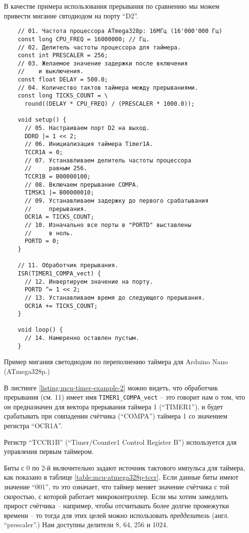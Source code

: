 \documentclass[../sparc.tex]{subfiles}
\begin{document}
В качестве примера использования прерывания по сравнению мы можем привести
мигание свтодиодом на порту ``D2''.

\begin{listing}[H]
  \begin{verbatim}
    // 01. Частота процессора ATmega328p: 16МГц (16'000'000 Гц)
    const long CPU_FREQ = 16000000; // Гц.
    // 02. Делитель частоты процессора для таймера.
    const int PRESCALER = 256;
    // 03. Желаемое значение задержки после включения
    //    и выключения.
    const float DELAY = 500.0;
    // 04. Количество тактов таймера между прерываниями.
    const long TICKS_COUNT = \
      round((DELAY * CPU_FREQ) / (PRESCALER * 1000.0));

    void setup() {
      // 05. Настраиваем порт D2 на выход.
      DDRD |= 1 << 2;
      // 06. Инициализация таймера Timer1A.
      TCCR1A = 0;
      // 07. Устанавливаем делитель частоты процессора
      //     равным 256.
      TCCR1B = B00000100;
      // 08. Включаем прерывание COMPA.
      TIMSK1 |= B00000010;
      // 09. Устанавливаем задержку до первого срабатывания
      //     прерывания.
      OCR1A = TICKS_COUNT;
      // 10. Изначально все порты в "PORTD" выставлены
      //     в ноль.
      PORTD = 0;
    }

    // 11. Обработчик прерывания.
    ISR(TIMER1_COMPA_vect) {
      // 12. Инвертируем значение на порту.
      PORTD ^= 1 << 2;
      // 13. Устанавливаем время до следующего прерывания.
      OCR1A += TICKS_COUNT;
    }

    void loop() {
      // 14. Намеренно оставлен пустым.
    }
  \end{verbatim}
  \caption{Пример мигания светодиодом по переполнению таймера для Arduino Nano
    (ATmega328p.)}
  \label{listing:mcu-timer-example-2}
\end{listing}

В листинге \ref{listing:mcu-timer-example-2} можно видеть, что обработчик
прерывания (см. 11) имеет имя \texttt{TIMER1_COMPA_vect} -- это говорит
нам о том, что он предназначен для вектора прерывания таймера 1 (``TIMER1''), и
будет срабатывать при совпадении счётчика (``COMPA'') таймера 1 со значением
регистра ``OCR1A''.


Регистр ``TCCR1B'' (``Timer/Counter1 Control Register B'') используется для
управления первым таймером.


Биты с 0 по 2-й включительно задают источник тактового импульса для таймера, как
показано в таблице \ref{table:mcu-atmega328p-tccr}.  Если данные биты имеют
значение ``001'', то это означает, что таймер меняет значение счётчика с той
скоростью, с которой работает микроконтроллер.  Если мы хотим замедлить прирост
счётчика -- например, чтобы отсчитывать более долгие промежутки времени -- то
тогда для этих целей можно использовать \emph{предделитель}
(англ. ``prescaler''.)  Нам доступны делители 8, 64, 256 и 1024.
\end{document}
